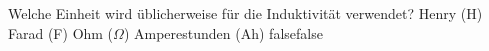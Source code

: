     {Welche Einheit wird üblicherweise für die Induktivität verwendet?}
    {Henry (H)}
    {Farad (F)}
    {Ohm ($\Omega$)}
    {Amperestunden (Ah)}
    {false}{false}